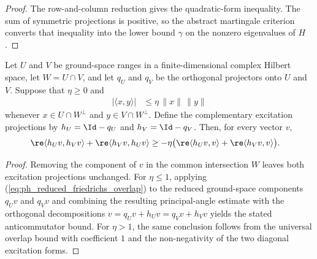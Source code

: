 \begin{proof}
    \leanok
    The row-and-column reduction gives the quadratic-form inequality.  The sum
    of symmetric projections is positive, so the abstract martingale criterion
    converts that inequality into the lower bound $\gamma$ on the nonzero
    eigenvalues of $H$.
\end{proof}

\begin{lemma}%
    \label{thm:friedrichs_ground_space_excitation_anticommutator}
    \leanok
    Let $U$ and $V$ be ground-space ranges in a finite-dimensional complex
    Hilbert space, let $W=U\cap V$, and let $q_U$ and $q_V$ be the orthogonal
    projectors onto $U$ and $V$. Suppose that $\eta\ge0$ and
    \begin{align}
        |\langle x,y\rangle|
         & \le \eta\,\|x\|\,\|y\|
        \label{eq:ph_reduced_friedrichs_overlap}
    \end{align}
    whenever $x\in U\cap W^\perp$ and $y\in V\cap W^\perp$. Define the
    complementary excitation projections by $h_U=\Id-q_U$ and
    $h_V=\Id-q_V$. Then, for every vector $v$,
    \begin{align}
        \re\langle h_Uv,h_Vv\rangle
        +\re\langle h_Vv,h_Uv\rangle
         & \ge
        -\eta\bigl(
        \re\langle h_Uv,v\rangle
        +\re\langle h_Vv,v\rangle
        \bigr).
        \label{eq:ph_friedrichs_excitation_anticommutator}
    \end{align}
\end{lemma}

\begin{proof}
    \leanok
    Removing the component of $v$ in the common intersection $W$ leaves both
    excitation projections unchanged. For $\eta\le1$, applying
    (\ref{eq:ph_reduced_friedrichs_overlap}) to the reduced ground-space
    components $q_Uv$ and $q_Vv$ and combining the resulting principal-angle
    estimate with the orthogonal decompositions
    $v=q_Uv+h_Uv=q_Vv+h_Vv$ yields the stated anticommutator bound. For
    $\eta>1$, the same conclusion follows from
    the universal overlap bound with coefficient $1$ and the non-negativity
    of the two diagonal excitation forms.
\end{proof}

